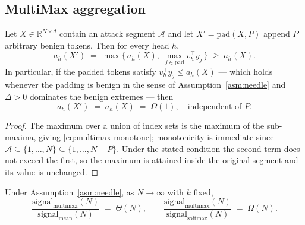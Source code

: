 \subsection{MultiMax aggregation}

\begin{theorem}
\label{thm:multimax}
Let $X\in\mathbb{R}^{N\times d}$ contain an attack segment $\mathcal{A}$ and let
$X'=\mathrm{pad}(X,P)$ append $P$ arbitrary benign tokens. Then for every head $h$,
\begin{equation}
  a_h(X')\;=\;\max\Big\{\,a_h(X),\;\max_{j\in\text{pad}} v_h^\top y_j\,\Big\}
  \;\ge\;a_h(X).
  \label{eq:multimax-monotone}
\end{equation}
In particular, if the padded tokens satisfy
$v_h^\top y_j\le a_h(X)$ --- which holds whenever the padding is benign in the sense of
Assumption~\ref{asm:needle} and $\Delta>0$ dominates the benign extremes --- then
\begin{equation}
  \boxed{\;a_h(X')\;=\;a_h(X)\;=\;\Omega(1),\quad\text{independent of }P.\;}
  \label{eq:multimax-invariance}
\end{equation}
\end{theorem}

\begin{proof}
The maximum over a union of index sets is the maximum of the sub-maxima, giving
\eqref{eq:multimax-monotone}; monotonicity is immediate since
$\mathcal{A}\subseteq\{1,\dots,N\}\subseteq\{1,\dots,N+P\}$. Under the stated condition
the second term does not exceed the first, so the maximum is attained inside the
original segment and its value is unchanged.
\end{proof}

\begin{corollary}
\label{cor:separation}
Under Assumption~\ref{asm:needle}, as $N\to\infty$ with $k$ fixed,
\begin{equation}
  \frac{\mathrm{signal}_{\mathrm{multimax}}(N)}{\mathrm{signal}_{\mathrm{mean}}(N)}
  \;=\;\Theta(N),
  \qquad
  \frac{\mathrm{signal}_{\mathrm{multimax}}(N)}{\mathrm{signal}_{\mathrm{softmax}}(N)}
  \;=\;\Omega(N).
  \label{eq:separation}
\end{equation}
\end{corollary}

